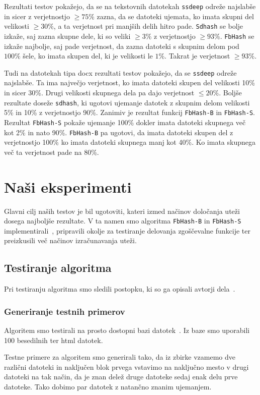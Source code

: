 \documentclass{acm_proc_article-sp}
\begin{document}
Rezultati testov pokažejo, da se na tekstovnih datotekah \texttt{ssdeep} odreže najslabše in sicer z verjetnostjo $\geq 75\%$ zazna, da se datoteki ujemata, ko imata skupni del velikosti $\geq 30\%$, a ta verjetnost pri manjših delih hitro pade. \texttt{Sdhash} se bolje izkaže, saj zazna skupne dele, ki so veliki $\geq 3\%$ z verjetnostjo $\geq 93\%$. \texttt{FbHash} se izkaže najbolje, saj pade verjetnost, da zazna datoteki s skupnim delom pod $100\%$ šele, ko imata skupen del, ki je velikosti le $1\%$. Takrat je verjetnost $\geq 93\%$.

Tudi na datotekah tipa docx rezultati testov pokažejo, da se \texttt{ssdeep} odreže najslabše. Ta ima največjo verjetnost, ko imata datoteki skupen del velikosti 10\% in sicer 30\%. Drugi velikosti skupnega dela pa dajo verjetnost $\leq 20\%$. Boljše rezultate doseže \texttt{sdhash}, ki ugotovi ujemanje datotek z skupnim delom velikosti 5\% in 10\% z verjetnostjo 90\%. Zanimiv je rezultat funkcij \texttt{FbHash-B} in \texttt{FbHash-S}. Rezultat \texttt{FbHash-S} pokaže ujemanje 100\% dokler imata datoteki skupnega več kot 2\% in nato 90\%. \texttt{FbHash-B} pa ugotovi, da imata datoteki skupen del z verjetnostjo 100\% ko imata datoteki skupnega manj kot 40\%. Ko imata skupnega več ta verjetnost pade na 80\%.
\\
\section{Na\v{s}i eksperimenti}
Glavni cilj naših testov je bil ugotoviti, kateri izmed načinov določanja uteži dosega najboljše rezultate. V ta namen smo algoritma \texttt{FbHash-B} in \texttt{FbHash-S} implementirali~\cite{repo}, pripravili okolje za testiranje delovanja zgoščevalne funkcije ter preizkusili več načinov izračunavanja uteži.

\subsection{Testiranje algoritma}
Pri testiranju algoritma smo sledili postopku, ki so ga opisali avtorji dela~\cite{fbhash}.

\subsubsection{Generiranje testnih primerov}
Algoritem smo testirali na prosto dostopni bazi datotek~\cite{zdataset}. Iz baze smo uporabili 100 besedilnih ter html datotek.

Testne primere za algoritem smo generirali tako, da iz zbirke vzamemo dve različni datoteki in naključen blok prvega vstavimo na naključno mesto v drugi datoteki na tak način, da je znan delež druge datoteke sedaj enak delu prve datoteke. Tako dobimo par datotek z natančno znanim ujemanjem.
\\
\end{document}
